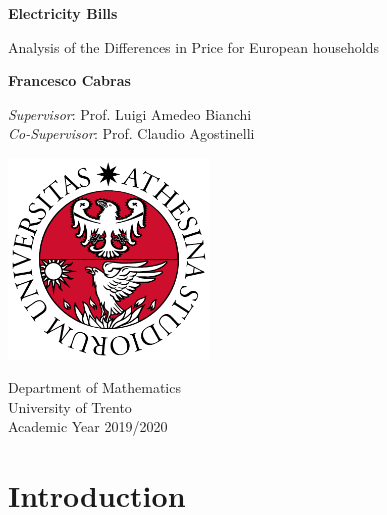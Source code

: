 \documentclass[a4paper,12pt]{book}
\begin{document}
\frontmatter
\begin{titlepage}
    \begin{center}
        \vspace*{1cm}

        \LARGE
        \textbf{Electricity Bills}

        \vspace{0.5cm}
        \large
        Analysis of the Differences in Price for European households

        \vspace{1.5cm}

        \textbf{Francesco Cabras}

        \vfill
        \textit{Supervisor}: Prof. Luigi Amedeo Bianchi\\
        \textit{Co-Supervisor}: Prof. Claudio Agostinelli

        \vspace{1.5cm}

        \includegraphics[width=0.4\textwidth]{Images/uni}

        Department of Mathematics\\
        University of Trento\\
        Academic Year 2019/2020

    \end{center}
\end{titlepage}
\thispagestyle{empty}
\tableofcontents

\mainmatter
\chapter{Introduction}
\end{document}
